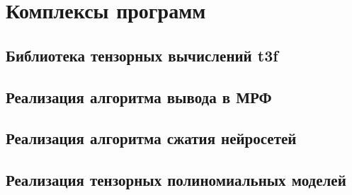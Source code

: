 \chapter{Комплексы программ} \label{chap:exm}
\section{Библиотека тензорных вычислений t3f} \label{sec:t3f}
\section{Реализация алгоритма вывода в МРФ} \label{sec:mrf-code}
\section{Реализация алгоритма сжатия нейросетей} \label{sec:exm-code}
\section{Реализация тензорных полиномиальных моделей} \label{sec:nn-code}
